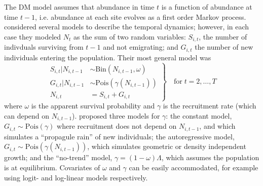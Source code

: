\documentclass[12pt]{article}
\begin{document}
The DM model assumes that abundance in time $t$ is a function of
abundance at time $t-1$, i.e. abundance at each site evolves as a
first order Markov process. %
\citet{dail_madsen:2011} considered several models to describe the temporal dynamics;
however, in each case they modeled $N_t$ as the sum of two random variables:
$S_{i,t}$, the number of indivduals surviving from $t-1$ and not
emigrating; and $G_{i,t}$ the number of new individuals entering
the population. Their most general model was
\begin{equation}
\left.\begin{aligned}
S_{i,t}|N_{i,t-1} &\sim \mathrm{Bin}(N_{i,t-1}, \omega) \\
G_{i,t}|N_{i,t-1} &\sim \mathrm{Pois}(\gamma(N_{i,t-1})) \\
N_{i,t} &= S_{i,t}+G_{i,t}
\end{aligned}\right\} \quad \text{for} \; t=2,\hdots,T
\label{eq:Nt}
\end{equation}
where $\omega$ is the apparent survival probability and $\gamma$
is the recruitment rate (which can depend on $N_{i,t-1}$).
\citet{dail_madsen:2011} proposed three
models for $\gamma$: the constant model,
$G_{i,t} \sim \mathrm{Pois}(\gamma)$ where recruitment does not
depend on $N_{i,t-1}$, and which simulates a ``propagule rain'' of new
individuals; the autoregressive model, $G_{i,t} \sim
\mathrm{Pois}(\gamma(N_{i,t-1}))$, which
simulates geometric or density independent growth; and the
``no-trend'' model, $\gamma = (1-\omega)\Lambda$, which assumes the
population is at equilibrium. Covariates of
$\omega$ and $\gamma$ can be easily accommodated, for example
using logit- and log-linear models respectively.

%
\end{document}
